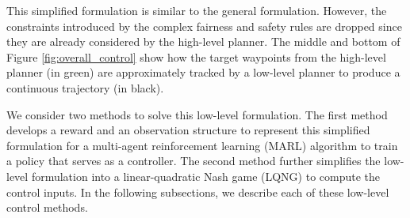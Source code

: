 This simplified formulation is similar to the general formulation. However, the constraints introduced by the complex fairness and safety rules are dropped since they are already considered by the high-level planner. The middle and bottom of Figure \ref{fig:overall_control} show how the target waypoints from the high-level planner (in green) are approximately tracked by a low-level planner to produce a continuous trajectory (in black). 

We consider two methods to solve this low-level formulation. The first method develops a reward and an observation structure to represent this simplified formulation for a multi-agent reinforcement learning (MARL) algorithm to train a policy that serves as a controller. The second method further simplifies the low-level formulation into a linear-quadratic Nash game (LQNG) to compute the control inputs. In the following subsections, we describe each of these low-level control methods.

